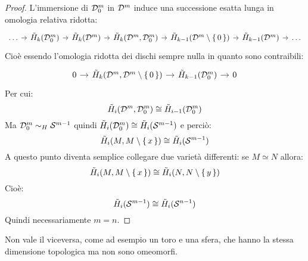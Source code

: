 \begin{proof}
  L'immersione di $ \mathcal{D}^{m}_0 $ in $ \mathcal{D}^{m} $ induce una
  successione esatta lunga in omologia relativa ridotta:
  \[
    \begin{tikzcd}[nodes = {column sep = 7pt}]
      \dots \rar & \tilde{H}_k(\Disk{m}_0) \rar & \tilde{H}_k(\Disk{m}) \rar & \tilde{H}_k(\Disk{m}, \Disk{m}_0) \rar &
      \tilde{H}_{k-1}(\Disk{m} \setminus \set{0}) \rar & \tilde{H}_{k-1}(\Disk{m}) \rar & \dots
    \end{tikzcd}
  \]
  Cioè essendo l'omologia ridotta dei dischi sempre nulla in quanto sono contraibili:
  \[
    \begin{tikzcd}[nodes = {column sep = 10pt}]
      0 \rar & \tilde{H}_k(\Disk{m}, \Disk{m} \setminus \set{0}) \rar &  \tilde{H}_{k-1}(\Disk{m}_0) \rar & 0
    \end{tikzcd}
  \]
  Per cui:
  \[
     \tilde{H}_i(\mathcal{D}^{m}, \mathcal{D}^{m}_0) \cong \tilde{H}_{i-1}(\mathcal{D}^{m}_0)
  \]
  Ma $ \mathcal{D}^{m}_0 \sim_H \mathcal{S}^{m-1} $ quindi
  $ \tilde{H}_i(\mathcal{D}^{m}_0) \cong \tilde{H}_i(\mathcal{S}^{m-1}) $
  e perciò:
  \[
    \tilde{H}_i(M, M \setminus \set{x}) \cong \tilde{H}_i(\mathcal{S}^{m-1})
  \]
  A questo punto diventa semplice collegare due varietà differenti: se $ M \simeq N $
  allora:
  \[
    \tilde{H}_i(M, M \setminus \set{x}) \cong \tilde{H}_i(N, N \setminus \set{y})
  \]
  Cioè:
  \[
    \tilde{H}_i(\mathcal{S}^{m-1}) \cong \tilde{H}_i(\mathcal{S}^{n-1})
  \]
  Quindi necessariamente $ m = n $.
\end{proof}
\begin{osservation}
  Non vale il viceversa, come ad esempio un toro e una sfera, che hanno la stessa
  dimensione topologica ma non sono omeomorfi.
\end{osservation}

